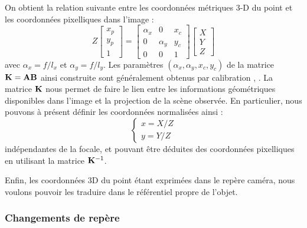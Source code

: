 On obtient la relation suivante entre les coordonnées métriques 3-D du point et 
les coordonnées pixelliques dans l'image :
\begin{equation}
Z\begin{bmatrix}
x_p \\y_p \\ 1
\end{bmatrix}
=
\begin{bmatrix}
\alpha_x & 0 & x_c \\ 0 & \alpha_y & y_c \\ 0 & 0 & 1 
\end{bmatrix}
\begin{bmatrix}
X \\ Y \\ Z
\end{bmatrix}
\label{chap01:eq05}
\end{equation}
avec $\alpha_x = f/l_x$ et $\alpha_y = f/l_y$. Les paramètres $(\alpha_x, 
\alpha_y, x_c, y_c)$ de la matrice ${\bf K} = {\bf A}{\bf B}$ ainsi construite 
sont généralement obtenus par calibration \cite{brown71}, \cite{tsai1986}. La 
matrice ${\bf K}$ nous permet de faire le lien entre les informations 
géométriques disponibles dans l'image et la projection de la scène observée. En 
particulier, nous pouvons à présent définir les coordonnées normalisées ainsi :
\begin{equation}
\left \lbrace
\begin{matrix}
x = X/Z \\
y = Y/Z
\end{matrix} \right .
\label{chap01:eq06}
\end{equation}
indépendantes de la focale, et pouvant être déduites des coordonnées 
pixelliques en utilisant la matrice ${\bf K}^{-1}$.

Enfin, les coordonn\'ees 3D du point \'etant exprim\'ees dans le rep\`ere 
cam\'era, nous voulons pouvoir les traduire dans le r\'ef\'erentiel propre de 
l'objet.

\subsubsection{Changements de rep\`ere} \label{chap1-0-1-1}

